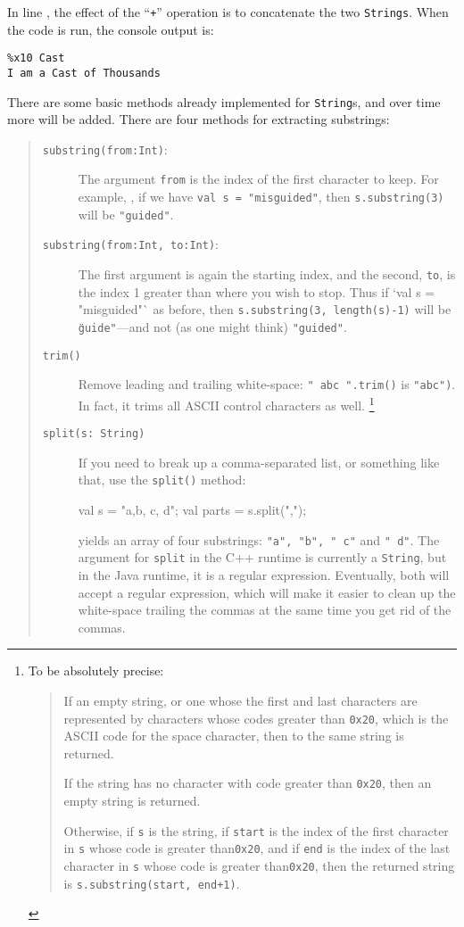 In line , the effect of the ``{\tt +}'' operation is to concatenate the two
{\tt Strings}.  When the code is run, the console output is:
\begin{verbatim}
%x10 Cast 
I am a Cast of Thousands
\end{verbatim}

There are some basic methods already implemented for {\tt String}s, and over
time more will be added. 
There are four methods for extracting substrings:
\begin{quote}
\begin{description}
\item[{\tt  substring(from:Int)}:] The argument {\tt from} is the index of the first
character to keep.  For example, , if we have {\tt val s = "misguided"}, then 
{\tt s.substring(3)} will be  {\tt "guided"}.
\item[{\tt substring(from:Int, to:Int)}:] The first argument is again the starting
index, and the second, {\tt to}, is the index 1 greater than where you
wish to stop.  Thus if  \xcd`val s = "misguided"` as before, then
{\tt s.substring(3, length(s)-1)} will be {\tt \"guide"}---and not (as one might
think) {\tt "guided"}.
\item[{\tt trim()}] Remove leading and trailing white-space: {\tt "  abc ".trim()}
is {\tt "abc")}.  In fact, it trims all ASCII control characters as well.
\footnote{ To be absolutely precise:
\begin{quote}
If an empty string, or one whose the first and last characters are represented
by characters whose codes greater than {\tt 0x20}, which is the ASCII code for
the space character, then to the same string is returned.

If the string has no character with code greater than {\tt 0x20}, 
then an empty string is returned.

Otherwise, if {\tt s} is the string, if {\tt start} is the index of the first character in
{\tt s} whose code is greater than{\tt 0x20}, and if {\tt end} is the index of the last
character in {\tt s} whose code is greater than{\tt 0x20}, then the returned string
is {\tt s.substring(start, end+1)}.
\end{quote}
}
\item[{\tt split(s: String)}]  If you need to break up a comma-separated
list, or something like that, use the {\tt split()} method:
\begin{xten}
val s = "a,b, c,  d";
val parts = s.split(",");
\end{xten}
yields an array of four substrings: {\tt "a", "b", " c"} and {\tt "  d"}.
The argument for {\tt split}  in the C++ runtime is currently a {\tt String},
but in the Java runtime, it is a regular expression.   
Eventually, both will accept a regular expression, which will make it
easier to clean up the white-space trailing the commas at the same
time you get rid of the commas.
\end{description}
\end{quote}


